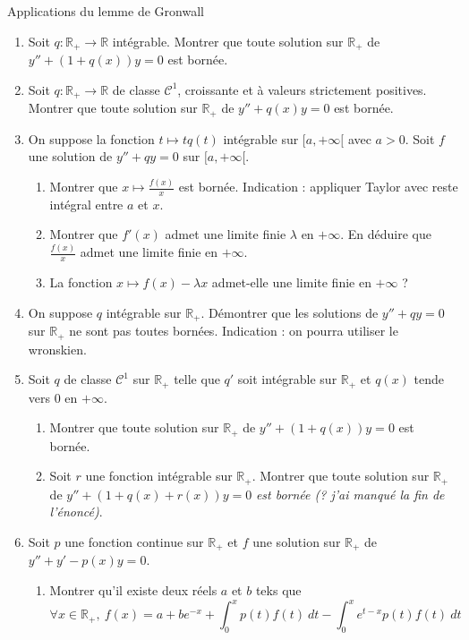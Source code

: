 \documentclass[french,a4paper]{article}
\newcommand{\R}{\mathbb{R}}
\theoremstyle{plain}
\theoremstyle{definition}
\theoremstyle{remark}
\begin{document}
\begin{ex}[Châteaux]{Applications du lemme de Gronwall}
	\begin{enumerate}
		\item Soit $q:\R_+\to\R$ intégrable. Montrer que toute solution sur $\R_+$ de $y''+(1+q(x))y=0$ est bornée.
		\item Soit $q:\R_+\to\R$ de classe $\mathcal{C}^1$, croissante et à valeurs strictement positives. Montrer que toute solution sur $\R_+$ de $y''+q(x)y=0$ est bornée.
		\item On suppose la fonction $t\mapsto tq(t)$ intégrable sur $[a,+\infty[$ avec $a>0$. Soit $f$ une solution de $y''+qy=0$ sur $[a,+\infty[$.
		\begin{enumerate}[label=\alph*.]
			\item Montrer que $\displaystyle x\mapsto\frac{f(x)}{x}$ est bornée. Indication : appliquer Taylor avec reste intégral entre $a$ et $x$.
			\item Montrer que $f'(x)$ admet une limite finie $\lambda$ en $+\infty$. En déduire que $\displaystyle\frac{f(x)}{x}$ admet une limite finie en $+\infty$.
			\item La fonction $x\mapsto f(x)-\lambda x$ admet-elle une limite finie en $+\infty$ ? 
		\end{enumerate}
		\item On suppose $q$ intégrable sur $\R_+$. Démontrer que les solutions de $y''+qy=0$ sur $\R_+$ ne sont pas toutes bornées. Indication : on pourra utiliser le wronskien.
		\item Soit $q$ de classe $\mathcal{C}^1$ sur $\R_+$ telle que $q'$ soit intégrable sur $\R_+$ et $q(x)$ tende vers $0$ en $+\infty$.
		\begin{enumerate}[label=\alph*.]
			\item Montrer que toute solution sur $\R_+$ de $y''+(1+q(x))y=0$ est bornée.
			\item Soit $r$ une fonction intégrable sur $\R_+$. Montrer que toute solution sur $\R_+$ de $y''+(1+q(x)+r(x))y=0$ \textit{est bornée (? j'ai manqué la fin de l'énoncé)}.
		\end{enumerate}
		\item Soit $p$ une fonction continue sur $\R_+$ et $f$ une solution sur $\R_+$ de $y''+y'-p(x)y=0$.
		\begin{enumerate}[label=\alph*.]
			\item Montrer qu'il existe deux réels $a$ et $b$ teks que $$\forall x\in\R_+,\ f(x)=a+be^{-x}+\int_{0}^{x}p(t)f(t)\ dt-\int_{0}^{x}e^{t-x}p(t)f(t)\ dt$$

\end{enumerate}
\end{enumerate}
\end{ex}
\end{document}
